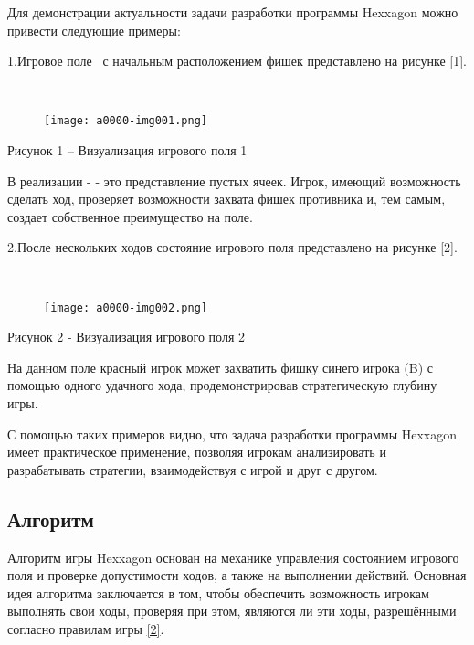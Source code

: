 \documentclass[a4paper]{article}
\begin{document}
Для демонстрации актуальности задачи разработки программы {\textquotedbl}Hexxagon{\textquotedbl} можно привести
следующие примеры:

1.Игровое поле \ с начальным расположением фишек представлено на рисунке [1].

{\centering
\ \ \ \ \ \ 
\begin{figure}[h]
    \centering
    \texttt{[image: a0000-img001.png]}
    \end{figure}

\par}

{\centering
Рисунок 1 – Визуализация игрового поля 1

\par}


В реализации {\textquotedbl}-{\textquotedbl} - это представление пустых ячеек. Игрок, имеющий возможность сделать ход,
проверяет возможности захвата фишек противника и, тем самым, создает собственное преимущество на поле.

2.После нескольких ходов состояние игрового поля представлено на рисунке [2].

{\centering
\ \ \ \ \ \ 
\begin{figure}[h]
    \centering
    \texttt{[image: a0000-img002.png]}
     \end{figure}

\par}

{\centering
Рисунок 2 - Визуализация игрового поля 2
\par}

На данном поле красный игрок может захватить фишку синего игрока (B) с помощью одного удачного хода, продемонстрировав
стратегическую глубину игры.

С помощью таких примеров видно, что задача разработки программы {\textquotedbl}Hexxagon{\textquotedbl} имеет
практическое применение, позволяя игрокам анализировать и разрабатывать стратегии, взаимодействуя с игрой и друг с
другом.\newline

\newpage 

\begin{center}
   \section{Алгоритм} 
\end{center}

Алгоритм игры {\textquotedbl}Hexxagon{\textquotedbl} основан на механике управления состоянием игрового поля и проверке
допустимости ходов, а также на выполнении действий. Основная идея алгоритма заключается в том, чтобы обеспечить
возможность игрокам выполнять свои ходы, проверяя при этом, являются ли эти ходы, разрешёнными согласно правилам игры
\hyperlink{mytextlabel}{[2]}.
\end{document}
